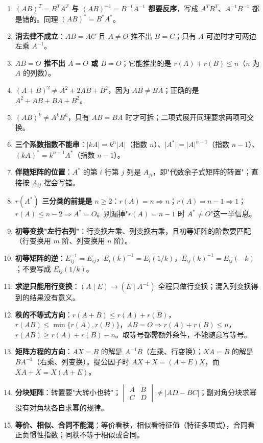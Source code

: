 \documentclass[11pt,openany,UTF8]{ctexbook}
\begin{document}
\begin{enumerate}
\item \textbf{$(AB)^T=B^TA^T$ 与 $(AB)^{-1}=B^{-1}A^{-1}$ 都要反序}，写成 $A^TB^T$、$A^{-1}B^{-1}$ 都是错的。同理 $(AB)^*=B^*A^*$。
\item \textbf{消去律不成立}：$AB=AC$ 且 $A\ne O$ 推不出 $B=C$；只有 $A$ 可逆时才可两边左乘 $A^{-1}$。
\item \textbf{$AB=O$ 推不出 $A=O$ 或 $B=O$}；它能推出的是 $r(A)+r(B)\le n$（$n$ 为 $A$ 的列数）。
\item \textbf{$(A+B)^2\ne A^2+2AB+B^2$}，因为 $AB\ne BA$；正确的是 $A^2+AB+BA+B^2$。
\item \textbf{$(AB)^k\ne A^kB^k$}，只有 $AB=BA$ 时才可拆；二项式展开同理要求两项可交换。
\item \textbf{三个系数指数不能串}：$\vert kA\vert=k^n\vert A\vert$（指数 $n$）、$\vert A^*\vert=\vert A\vert^{n-1}$（指数 $n-1$）、$(kA)^*=k^{n-1}A^*$（指数 $n-1$）。
\item \textbf{伴随矩阵的位置}：$A^*$ 的第 $i$ 行第 $j$ 列是 $A_{ji}$，即"代数余子式矩阵的转置"；直接按 $A_{ij}$ 摆会写错。
\item \textbf{$r(A^*)$ 三分类的前提是 $n\ge2$}：$r(A)=n\Rightarrow n$；$r(A)=n-1\Rightarrow1$；$r(A)\le n-2\Rightarrow A^*=O$。别漏掉"$r(A)=n-1$ 时 $A^*\ne O$"这一半信息。
\item \textbf{初等变换"左行右列"}：行变换左乘、列变换右乘，且初等矩阵的阶数要匹配（行变换用 $m$ 阶、列变换用 $n$ 阶）。
\item \textbf{初等矩阵的逆}：$E_{ij}^{-1}=E_{ij}$，$E_i(k)^{-1}=E_i(1/k)$，$E_{ij}(k)^{-1}=E_{ij}(-k)$；不要写成 $E_{ij}(1/k)$。
\item \textbf{求逆只能用行变换}：$(A\mid E)\to(E\mid A^{-1})$ 全程只做行变换；混入列变换得到的结果没有意义。
\item \textbf{秩的不等式方向}：$r(A+B)\le r(A)+r(B)$，$r(AB)\le\min\{r(A),r(B)\}$，$AB=O\Rightarrow r(A)+r(B)\le n$，$r(AB)\ge r(A)+r(B)-n$。取等号都需额外条件，不能随意写等号。
\item \textbf{矩阵方程的方向}：$AX=B$ 的解是 $A^{-1}B$（左乘、行变换）；$XA=B$ 的解是 $BA^{-1}$（右乘、列变换）。提公因子时 $AX+X=(A+E)X$，而 $XA+X=X(A+E)$。
\item \textbf{分块矩阵}：转置要"大转小也转"；$\begin{vmatrix}A&B\\C&D\end{vmatrix}\ne\vert AD-BC\vert$；副对角分块求幂没有对角块各自求幂的规律。
\item \textbf{等价、相似、合同不能混}：等价看秩，相似看特征值（特征多项式），合同看正负惯性指数；同秩不等于相似或合同。
\end{enumerate}
\end{document}
